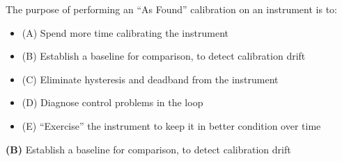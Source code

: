 

The purpose of performing an ``As Found'' calibration on an instrument is to:

\begin{itemize}
\item{(A)} Spend more time calibrating the instrument
\vskip 5pt 
\item{(B)} Establish a baseline for comparison, to detect calibration drift
\vskip 5pt 
\item{(C)} Eliminate hysteresis and deadband from the instrument
\vskip 5pt 
\item{(D)} Diagnose control problems in the loop
\vskip 5pt 
\item{(E)} ``Exercise'' the instrument to keep it in better condition over time
\end{itemize}







{\bf (B)} Establish a baseline for comparison, to detect calibration drift
 









